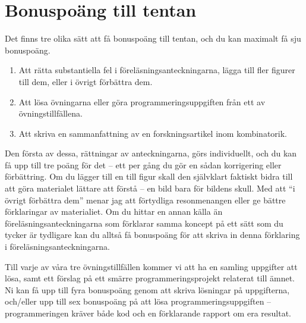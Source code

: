 \documentclass{tufte-handout}
\begin{document}
\section{Bonuspoäng till tentan}

Det finns tre olika sätt att få bonuspoäng till tentan, och du kan maximalt få sju bonuspoäng.

\begin{enumerate}
	\item Att rätta substantiella fel i föreläsningsanteckningarna, lägga till fler figurer till dem, eller i övrigt förbättra dem.
	\item Att lösa övningarna eller göra programmeringsuppgiften från ett av övningstillfällena.
	\item Att skriva en sammanfattning av en forskningsartikel inom kombinatorik.
\end{enumerate}

Den första av dessa, rättningar av anteckningarna, görs individuellt, och du kan få upp till tre poäng för det -- ett per gång du gör en sådan korrigering eller förbättring. Om du lägger till en till figur skall den självklart faktiskt bidra till att göra materialet lättare att förstå -- en bild bara för bildens skull. Med att ``i övrigt förbättra dem'' menar jag att förtydliga resonmenangen eller ge bättre förklaringar av materialiet. Om du hittar en annan källa än föreläsningsanteckningarna som förklarar samma koncept på ett sätt som du tycker är tydligare kan du alltså få bonuspoäng för att skriva in denna förklaring i föreläsningsanteckningarna.

Till varje av våra tre övningstillfällen kommer vi att ha en samling uppgifter att lösa, samt ett förslag på ett smärre programmeringsprojekt relaterat till ämnet. Ni kan få upp till fyra bonuspoäng genom att skriva lösningar på uppgifterna, och/eller upp till sex bonuspoäng på att lösa programmeringsuppgiften -- programmeringen kräver både kod och en förklarande rapport om era resultat.
\end{document}
